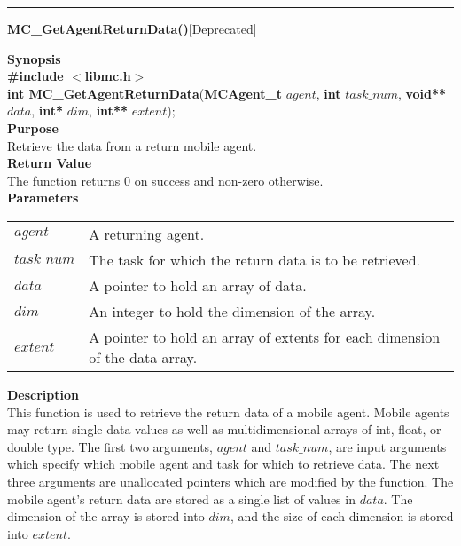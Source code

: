\noindent
\vspace{5pt}
\rule{6.5in}{0.015in}
\noindent
{\LARGE \bf MC\_GetAgentReturnData()}[Deprecated]\\
{}

\noindent
{\bf Synopsis}\\
{\bf \#include $<$libmc.h$>$}\\
{\bf int MC\_GetAgentReturnData}({\bf MCAgent\_t} $agent$, 
                                 {\bf int} $task\_num$, 
                                 {\bf void**} $data$,
                                 {\bf int*} $dim$,
                                 {\bf int**} $extent$);\\

\noindent
{\bf Purpose}\\
Retrieve the data from a return mobile agent.\\ 

\noindent
{\bf Return Value}\\
The function returns 0 on success and non-zero otherwise.\\

\noindent
{\bf Parameters}
\vspace{-0.1in}
\begin{description}
\item               
\begin{tabular}{p{20 mm}p{135 mm}}
$agent$ & A returning agent.\\
$task\_num$ & The task for which the return data is to be retrieved.\\ 
$data$ & A pointer to hold an array of data.\\
$dim$ & An integer to hold the dimension of the array.\\
$extent$ & A pointer to hold an array of extents for each dimension of the 
data array.
\end{tabular}
\end{description}

\noindent
{\bf Description}\\
This function is used to retrieve the return data of a mobile agent. 
Mobile agents may return single data values as well as multidimensional arrays 
of int, float, or double type. 
The first two arguments, $agent$ and $task\_num$, are input arguments which 
specify which mobile agent and task for which to retrieve data. 
The next three arguments are unallocated pointers which are modified by the 
function. 
\noindent
The mobile agent's return data are stored as a single list of values in 
$data$. 
The dimension of the array is stored into $dim$, and the size of each 
dimension is stored into $extent$.\\

